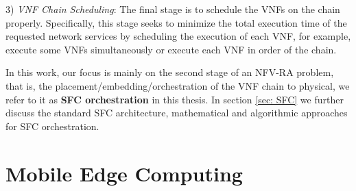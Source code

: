 3) \textit{VNF Chain Scheduling}: The final stage is to schedule the VNFs on the chain properly. Specifically, this stage seeks to minimize the total execution time of the requested network services by scheduling the execution of each VNF, for example, execute some VNFs simultaneously or execute each VNF in order of the chain. 


In this work, our focus is mainly on the second stage of an NFV-RA problem, that is, the placement/embedding/orchestration of the VNF chain to physical, we refer to it as \textbf{SFC orchestration} in this thesis. In section \ref{sec: SFC} we further discuss the standard SFC architecture,  mathematical and algorithmic approaches for SFC orchestration.







\section{Mobile Edge Computing}
\label{sec: MEC}
